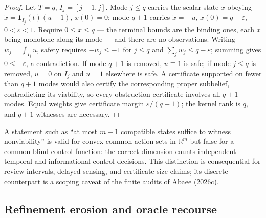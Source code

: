 \documentclass[10pt,twocolumn]{article}
\theoremstyle{plain}
\theoremstyle{definition}
\theoremstyle{remark}
\begin{document}
\begin{proof}
Let \(T = q\), \(I_j = [j-1, j]\). Mode \(j \le q\) carries the scalar state \(x\) obeying
\(\dot x = \mathbf{1}_{I_j}(t)(u - 1)\), \(x(0) = 0\); mode \(q+1\)
carries \(\dot x = -u\), \(x(0) = q - \varepsilon\), \(0 < \varepsilon
< 1\). Require \(0 \le x \le q\) --- the terminal bounds are the binding
ones, each \(x\) being monotone along its mode --- and there are no
observations. Writing
\(w_j = \int_{I_j} u\), safety requires \(-w_j \le -1\) for \(j \le q\) and
\(\sum_j w_j \le q - \varepsilon\); summing gives \(0 \le -\varepsilon\), a
contradiction. If mode \(q+1\) is removed, \(u \equiv 1\) is safe; if mode
\(j \le q\) is removed, \(u = 0\) on \(I_j\) and \(u = 1\) elsewhere is
safe. A certificate supported on fewer than \(q+1\) modes would also
certify the corresponding proper subbelief, contradicting its viability, so
every obstruction certificate involves all \(q+1\) modes. Equal weights give certificate margin \(\varepsilon/(q+1)\); the
kernel rank is \(q\), and \(q+1\) witnesses are necessary.
\end{proof}

A statement such as ``at most \(m+1\) compatible states suffice to witness
nonviability'' is valid for convex common-action sets in \(\mathbb{R}^m\) but
false for a common blind control function: the correct dimension counts
independent temporal and informational control decisions. This distinction
is consequential for review intervals, delayed sensing, and
certificate-size claims; its discrete counterpart is a scoping caveat of the
finite audits of Abaee (2026c).

\subsection{Refinement erosion and oracle recourse}\label{erosion}
\end{document}

